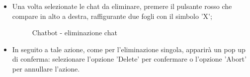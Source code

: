 \documentclass[10pt, a4paper]{article}
\begin{document}
\begin{itemize}
    \item Una volta selezionate le chat da eliminare, premere il pulsante rosso che compare in alto a destra, raffigurante due fogli con il simbolo 'X';
    \begin{figure}[H]
        \centering  
        \caption{Chatbot - eliminazione chat}
    \end{figure}
    \item In seguito a tale azione, come per l'eliminazione singola, apparirà un pop up di conferma: selezionare l'opzione 'Delete' per confermare o l'opzione 'Abort' per annullare l'azione.
\end{itemize}
\end{document}
